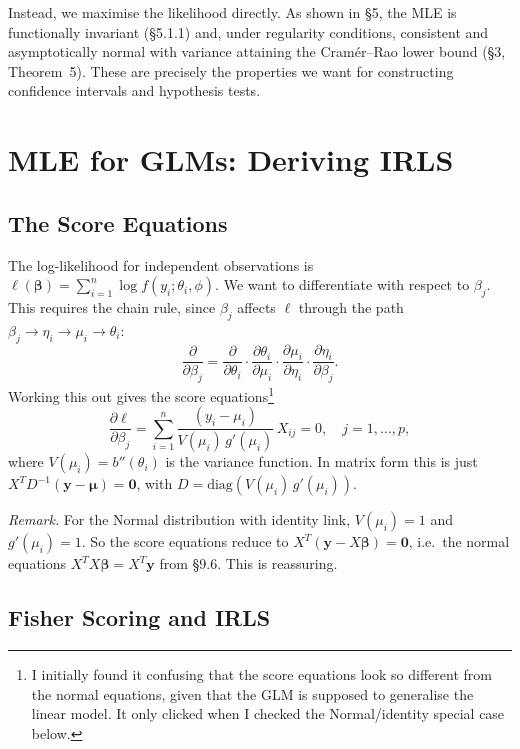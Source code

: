 \documentclass[11pt]{article}
\begin{document}
\noindent Instead, we maximise the likelihood directly. As shown in \S5, the MLE is
functionally invariant (\S5.1.1) and, under regularity conditions, consistent and
asymptotically normal with variance attaining the Cram\'er--Rao lower bound (\S3,
Theorem~5). These are precisely the properties we want for constructing confidence intervals
and hypothesis tests.

\section{MLE for GLMs: Deriving IRLS}

\subsection{The Score Equations}

The log-likelihood for independent observations is $\ell(\boldsymbol{\beta}) = \sum_{i=1}^n \log f(y_i; \theta_i, \phi)$.
We want to differentiate with respect to $\beta_j$. This requires the chain rule, since $\beta_j$ affects $\ell$ through the path
$\beta_j \to \eta_i \to \mu_i \to \theta_i$:
\begin{equation*}
\frac{\partial}{\partial \beta_j} = \frac{\partial}{\partial \theta_i}\cdot\frac{\partial \theta_i}{\partial \mu_i}\cdot\frac{\partial \mu_i}{\partial \eta_i}\cdot\frac{\partial \eta_i}{\partial \beta_j}.
\end{equation*}
Working this out gives the score equations\footnote{I initially found it confusing that the score equations look so different from the normal equations,
given that the GLM is supposed to generalise the linear model. It only clicked when I checked the Normal/identity special case below.}
\begin{equation*}
    \frac{\partial \ell}{\partial \beta_j} = \sum_{i=1}^n \frac{(y_i - \mu_i)}{V(\mu_i)\,g'(\mu_i)}\,X_{ij} = 0,
    \quad j = 1,\dots,p,
\end{equation*}
where $V(\mu_i) = b''(\theta_i)$ is the variance function.
In matrix form this is just $X^T D^{-1}(\mathbf{y}-\boldsymbol{\mu})=\mathbf{0}$,
with $D = \mathrm{diag}(V(\mu_i)\,g'(\mu_i))$.

\noindent \textit{Remark.} For the Normal distribution with identity link, $V(\mu_i)=1$ and
$g'(\mu_i)=1$. So the score equations reduce to $X^T(\mathbf{y}-X\boldsymbol{\beta})=\mathbf{0}$,
i.e.\ the normal equations $X^TX\boldsymbol{\beta} = X^T\mathbf{y}$ from \S9.6. This is reassuring.

\subsection{Fisher Scoring and IRLS}
\end{document}
